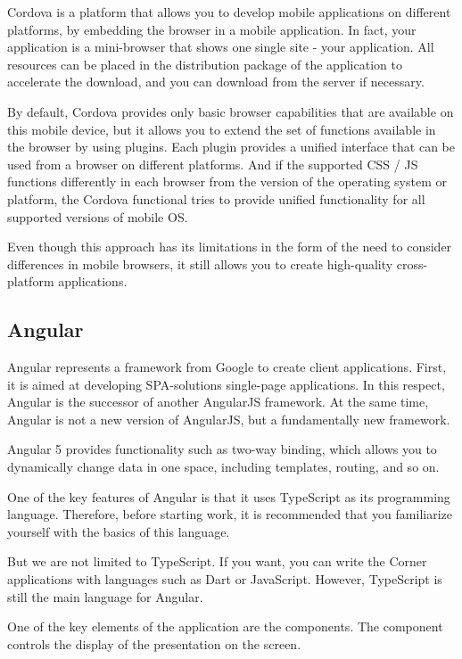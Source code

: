 Cordova is a platform that allows you to develop mobile applications on different platforms, by embedding the browser in a mobile application. In fact, your application is a mini-browser that shows one single site - your application. All resources can be placed in the distribution package of the application to accelerate the download, and you can download from the server if necessary.\par
By default, Cordova provides only basic browser capabilities that are available on this mobile device, but it allows you to extend the set of functions available in the browser by using plugins. Each plugin provides a unified interface that can be used from a browser on different platforms. And if the supported CSS / JS functions differently in each browser from the version of the operating system or platform, the Cordova functional tries to provide unified functionality for all supported versions of mobile OS.\par
Even though this approach has its limitations in the form of the need to consider differences in mobile browsers, it still allows you to create high-quality cross-platform applications. \cite{Cordova}

\subsection{Angular}
Angular represents a framework from Google to create client applications. First, it is aimed at developing SPA-solutions single-page applications. In this respect, Angular is the successor of another AngularJS framework. At the same time, Angular is not a new version of AngularJS, but a fundamentally new framework.\par
Angular 5 provides functionality such as two-way binding, which allows you to dynamically change data in one space, including templates, routing, and so on.\par
One of the key features of Angular is that it uses TypeScript as its programming language. Therefore, before starting work, it is recommended that you familiarize yourself with the basics of this language.\par
But we are not limited to TypeScript. If you want, you can write the Corner applications with languages such as Dart or JavaScript. However, TypeScript is still the main language for Angular. \par
One of the key elements of the application are the components. The component controls the display of the presentation on the screen. \cite{Angular}

